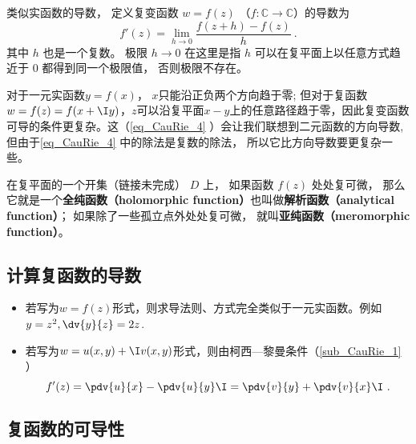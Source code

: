 
\begin{issues}
\issueTODO
\end{issues}


\begin{definition}{}
类似实函数的导数， 定义复变函数 $w = f(z)$ （$f:\mathbb C\to \mathbb C$）的导数为
\begin{equation}\label{eq_CauRie_4}
f'(z) = \lim_{h\to 0} \frac{f(z + h) - f(z)}{h}~.
\end{equation}
其中 $h$ 也是一个复数。 极限 $h \to 0$ 在这里是指 $h$ 可以在复平面上以任意方式趋近于 $0$ 都得到同一个极限值， 否则极限不存在。
\end{definition}

对于一元实函数$y=f(x)$， $x$只能沿正负两个方向趋于零; 但对于复函数$w=f(z)=f(x+\I y)$，$z$可以沿复平面$x-y$上的任意路径趋于零，因此复变函数可导的条件更复杂。这（\autoref{eq_CauRie_4} ）会让我们联想到二元函数的方向导数, 但由于\autoref{eq_CauRie_4} 中的除法是复数的除法， 所以它比方向导数要更复杂一些。

在复平面的一个开集（链接未完成） $D$ 上， 如果函数 $f(z)$ 处处复可微， 那么它就是一个\textbf{全纯函数（holomorphic function）}也叫做\textbf{解析函数（analytical function）}； 如果除了一些孤立点外处处复可微， 就叫\textbf{亚纯函数（meromorphic function）}。

\subsection{计算复函数的导数}
\begin{itemize}
\item 若写为$w=f(z)$形式，则求导法则、方式完全类似于一元实函数。例如$y=z^2, \dv{y}{z}=2z$.
\item 若写为$w=u(x,y)+\I v(x,y)$形式，则由柯西—黎曼条件（\autoref{sub_CauRie_1} ）
\begin{equation}
f'(z) = \pdv{u}{x} -\pdv{u}{y} \I = \pdv{v}{y} + \pdv{v}{x}\I~.
\end{equation}
\end{itemize}

\subsection{复函数的可导性}\label{sub_CauRie_1}

